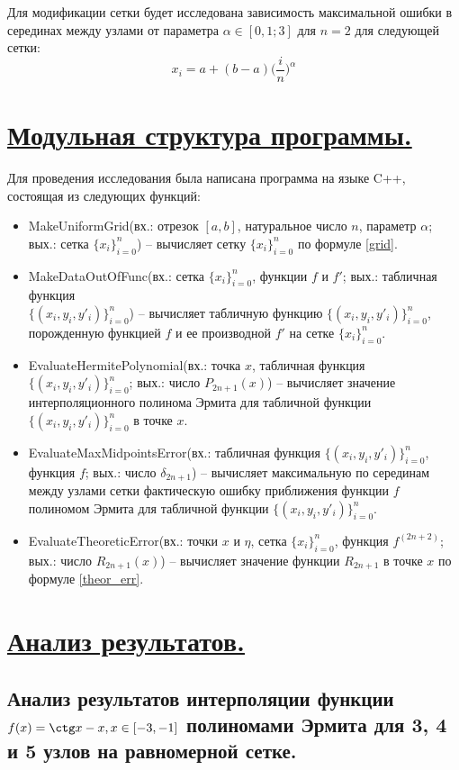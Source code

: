\documentclass[a4paper, 12pt]{article}
\begin{document}
	Для модификации сетки будет исследована зависимость максимальной ошибки в серединах между узлами от параметра $\alpha\in[0,1;3]$ для $n=2$ для следующей сетки:
    \begin{equation} \label{grid}
    	x_i=a+(b-a)\bigg(\frac{i}{n}\bigg)^\alpha
    \end{equation}
	
	\section{\underline{Модульная структура программы.}}
	Для проведения исследования была написана программа на языке C++, состоящая из следующих функций:
	\begin{itemize}
		\item MakeUniformGrid(вх.: отрезок $[a,b]$, натуральное число $n$, параметр $\alpha$; вых.: сетка $\{x_i\}_{i=0}^n$) -- вычисляет сетку $\{x_i\}_{i=0}^n$ по формуле \eqref{grid}.
		\item MakeDataOutOfFunc(вх.: сетка $\{x_i\}_{i=0}^n$, функции $f$ и $f'$; вых.: табличная функция \\ $\{(x_i,y_i,y'_i)\}_{i=0}^n$) -- вычисляет табличную функцию $\{(x_i,y_i,y'_i)\}_{i=0}^n$, порожденную функцией $f$ и ее производной $f'$ на сетке $\{x_i\}_{i=0}^n$.
		\item EvaluateHermitePolynomial(вх.: точка $x$, табличная функция $\{(x_i,y_i,y'_i)\}_{i=0}^n$; вых.: число $P_{2n+1}(x)$) -- вычисляет значение интерполяционного полинома Эрмита для табличной функции $\{(x_i,y_i,y'_i)\}_{i=0}^n$ в точке $x$.
		\item EvaluateMaxMidpointsError(вх.: табличная функция $\{(x_i,y_i,y'_i)\}_{i=0}^n$, функция $f$; вых.: число $\delta_{2n+1}$) -- вычисляет максимальную по серединам между узлами сетки фактическую ошибку приближения функции $f$ полиномом Эрмита для табличной функции $\{(x_i,y_i,y'_i)\}_{i=0}^n$.
		\item EvaluateTheoreticError(вх.: точки $x$ и $\eta$, сетка $\{x_i\}_{i=0}^n$, функция $f^{(2n+2)}$; вых.: число $R_{2n+1}(x)$) -- вычисляет значение функции $R_{2n+1}$ в точке $x$ по формуле \eqref{theor_err}.
	\end{itemize}
	
	\section{\underline{Анализ результатов.}}
	
	\subsection{Анализ результатов интерполяции функции $f(x)=\ctg x-x, x\in[-3,-1]$ полиномами Эрмита для 3, 4 и 5 узлов на равномерной сетке.} 
	
\end{document}
